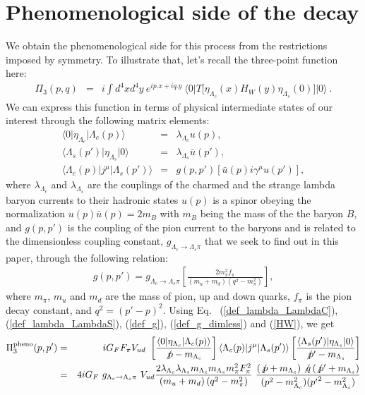 \documentclass[twoside]{article}
\begin{document}
\section{Phenomenological side of the decay}
We obtain the phenomenological side for this process from the restrictions 
imposed by symmetry. To illustrate that, let's recall the three-point function 
here:
\begin{eqnarray}
\label{def_pi3}
\Pi_3(p,q) &=&
i \int d^4 x d^4 y~ e^{ip.x + iq.y}~ \langle 0 \vert T \Big[
\eta_{\Lambda_c}(x) H_W(y) \eta_{\Lambda_s}(0)
\Big] \vert 0 \rangle~.
\end{eqnarray}
We can express this function in terms of physical intermediate states of our 
interest through the following matrix elements:
\begin{eqnarray}
\label{def_lambda_LambdaC}
\langle 0 \vert \eta_{\Lambda_c} \vert \Lambda_c(p) \rangle &=& \lambda_{\Lambda_c} 
u(p), \\
\label{def_lambda_LambdaS}
\langle \Lambda_s(p') \vert \eta_{\Lambda_s} \vert 0 \rangle &=& \lambda_{\Lambda_s}
 \bar{u}(p'), \\
\label{def_g}
\langle \Lambda_c(p) \vert j^\mu \vert \Lambda_s(p') \rangle &=&
g(p,p')  \left[ \bar{u}(p) i \gamma^\mu  u(p') \right],
\end{eqnarray}
where $\lambda_{\Lambda_c}$ and $\lambda_{\Lambda_s}$ are the couplings of the 
charmed and the strange lambda baryon currents to their hadronic states $u(p)$ 
is a spinor obeying the normalization $u(p) \bar{u}(p) = 2 m_B$ with $m_B$ 
being the mass of the the baryon $B$, and $g(p,p')$ is the coupling of the pion
 current to the baryons and is related to the dimensionless coupling constant, 
$g_{\Lambda_c \rightarrow \Lambda_s \pi}$ that we seek to find out in this paper, 
through the following relation\cite{RRY85}:
\begin{eqnarray}
\label{def_g_dimless}
g(p,p') = g_{\Lambda_c \rightarrow \Lambda_s \pi} \left[ \frac{2 m_\pi^2 f_\pi}{\left(m_u 
+ m_d \right) \left( q^2 - m_\pi^2 \right)} \right],
\end{eqnarray}
where $m_\pi$, $m_u$ and $m_d$ are the mass of pion, up and down quarks, $f_\pi$ 
is the pion decay constant, and $q^2 = (p'-p)^2$. Using Eq.
~(\ref{def_lambda_LambdaC}), (\ref{def_lambda_LambdaS}), (\ref{def_g}), 
(\ref{def_g_dimless}) and (\ref{HW}), we get
\begin{eqnarray}
\label{Pi3Pheno1}
\Pi_3^{\rm{pheno}}(p,p')
&=&
iG_F F_\pi V_{ud} 
~
\left[
\frac{\langle 0 \vert \eta_{\Lambda_c} \vert \Lambda_c(p) \rangle }
{\not{p} - m_{\Lambda_c}} \right] 
\langle \Lambda_c(p) \vert j^\mu \vert \Lambda_s(p') \rangle
\left[
\frac{
\langle \Lambda_s(p') \vert \eta_{\Lambda_s} \vert 0 \rangle}
{\not{p'} - m_{\Lambda_s}} 
\right] \nonumber\\ 
&=&
4i G_F ~g_{\Lambda_c \rightarrow \Lambda_s \pi} ~V_{ud}
\frac{2 \lambda_{\Lambda_c} \lambda_{\Lambda_s} m_{\Lambda_c} m_{\Lambda_s} m_\pi^2 F_\pi^2 }
{\left(m_u+ m_d \right)  \left( q^2 - m_\pi^2 \right)} ~
\frac{\left( \not{p}+m_{\Lambda_c} \right) \not{q} \left(\not{p'} + m_{\Lambda_s} 
\right)}{(p^2 - m_{\Lambda_c}^2)({p'}^2 - m_{\Lambda_s}^2)}
\end{eqnarray}
\end{document}
